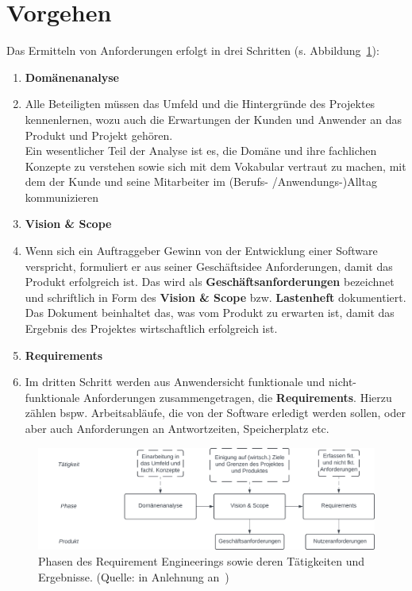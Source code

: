 \section{Vorgehen}

\noindent
Das Ermitteln von Anforderungen erfolgt in drei Schritten (s. Abbildung~\ref{fig:requirementsengineering}):

\begin{enumerate}
    \item \textbf{Domänenanalyse}
    \item[] Alle Beteiligten müssen das Umfeld und die Hintergründe des Projektes kennenlernen, wozu auch die Erwartungen
    der Kunden und Anwender an das Produkt und Projekt gehören.\\
    Ein wesentlicher Teil der Analyse ist es, die Domäne und ihre fachlichen Konzepte zu verstehen sowie sich mit dem Vokabular vertraut zu machen, mit dem der Kunde und seine Mitarbeiter im (Berufs- /Anwendungs-)Alltag kommunizieren
    \item \textbf{Vision \& Scope}
    \item[] Wenn sich ein Auftraggeber Gewinn von der Entwicklung einer Software verspricht, formuliert er aus seiner Geschäftsidee Anforderungen, damit das Produkt erfolgreich ist.
    Das wird als \textbf{Geschäftsanforderungen} bezeichnet und schriftlich in Form des \textbf{Vision \& Scope} bzw. \textbf{Lastenheft} dokumentiert.
    Das Dokument beinhaltet das, was vom Produkt zu erwarten ist, damit das Ergebnis des Projektes wirtschaftlich erfolgreich ist.
    \item \textbf{Requirements}
    \item[] Im dritten Schritt werden aus Anwendersicht funktionale und nicht-funktionale Anforderungen zusammengetragen, die \textbf{Requirements}.
    Hierzu zählen bspw. Arbeitsabläufe, die von der Software erledigt werden sollen, oder aber auch Anforderungen an Antwortzeiten, Speicherplatz etc.
\end{enumerate}



\begin{figure}
    \centering
    \includegraphics[scale=0.35]{chapters/Requirements Engineering/img/requirementsengineering}
    \caption{Phasen des Requirement Engineerings sowie deren Tätigkeiten und Ergebnisse. (Quelle: in Anlehnung an~\cite[84]{Wed09})}
    \label{fig:requirementsengineering}
\end{figure}

